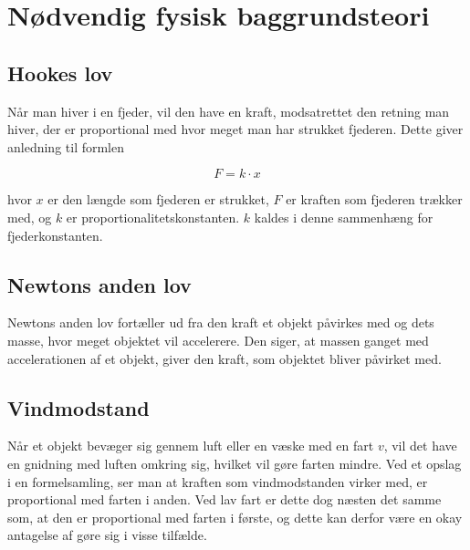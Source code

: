\section{Nødvendig fysisk baggrundsteori}
\subsection{Hookes lov}\label{teori:Hooks lov}
Når man hiver i en fjeder, vil den have en kraft, modsatrettet den retning man hiver, der er proportional med hvor meget man har strukket fjederen. 
Dette giver anledning til formlen 

\begin{equation}
F =k\cdot x
\end{equation}

hvor $x$ er den længde som fjederen er strukket, $F$ er kraften som fjederen trækker med, og $k$ er proportionalitetskonstanten. 
$k$ kaldes i denne sammenhæng for fjederkonstanten.

\subsection{Newtons anden lov}\label{teori:Newtons anden lov}
Newtons anden lov fortæller ud fra den kraft et objekt påvirkes med og dets masse, hvor meget objektet vil accelerere. 
Den siger, at massen ganget med accelerationen af et objekt, giver den kraft, som objektet bliver påvirket med.

\subsection{Vindmodstand}\label{teori:vindmodstand}
Når et objekt bevæger sig gennem luft eller en væske med en fart $v$, vil det have en gnidning med luften omkring sig, hvilket vil gøre farten mindre.
Ved et opslag i en formelsamling, ser man at kraften som vindmodstanden virker med, er proportional med farten i anden. 
Ved lav fart er dette dog næsten det samme som, at den er proportional med farten i første, og dette kan derfor være en okay antagelse af gøre sig i visse tilfælde.
